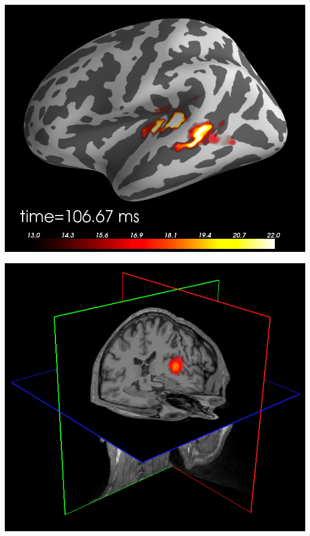 \documentclass[slidestop,11pt,compress,serif]{beamer} %
\begin{document}
\begin{frame}[plain,t]
\begin{minipage}{.27\linewidth}
\end{minipage}%
\hfill%
\begin{minipage}{.23\linewidth}
    \includegraphics[width=\linewidth]{pysurfer.png}%
\end{minipage}%
\hfill%
\begin{minipage}{.21\linewidth}
    \includegraphics[width=\linewidth]{mne_lcmv_freeview.png}%
\end{minipage}%
\hfill%
\hfill%
\medskip

\smallskip
~


\end{frame}
\end{document}
